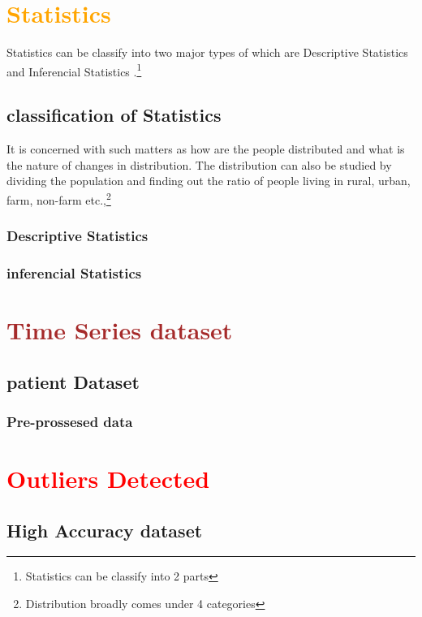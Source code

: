 \documentclass[a4paer,12pt]{book}
\begin{document}
	\tableofcontents
	\chapter{\textcolor{orange}{Statistics }}
	Statistics can be classify into two major types of which are Descriptive Statistics and
	Inferencial Statistics .\footnote{Statistics can be classify into 2 parts}
	\section{classification of Statistics }
	It is concerned with such matters as how are the people distributed and what is the nature of
	changes in distribution. The distribution can also be studied by dividing the population and finding
	out the ratio of people living in rural, urban, farm, non-farm etc.,\footnote{Distribution broadly
		comes under 4 categories}
	\subsection{Descriptive Statistics}
	\blindtext[1]
	\subsection{inferencial Statistics }
	\blindtext[2]
	\chapter{\textcolor{brown}{Time Series dataset}}
	\blindtext[1]
	\section{patient Dataset}
	\blindtext[2]
	\subsection{Pre-prossesed data }
	\blindtext[1]
	\chapter{\textcolor{red}{Outliers Detected }}
	
	\textbf{\blindtext[1]}
	\section{High Accuracy dataset }
	\blindtext[1]
\end{document}
